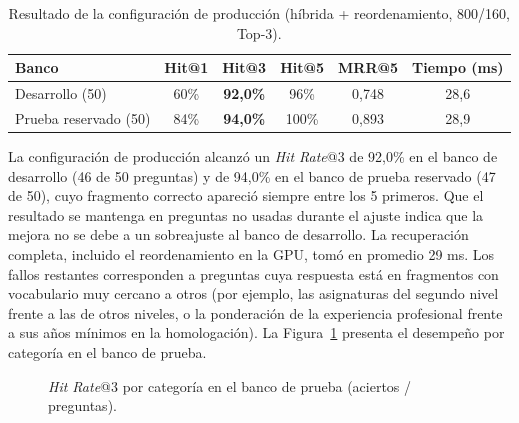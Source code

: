 \begin{table}[H]
  \caption{Resultado de la configuración de producción (híbrida + reordenamiento, 800/160, Top-3).}
  \label{tab:rag_final}
  \centering
  \small
  \renewcommand{\arraystretch}{1.2}
  \begin{tabular}{|l|c|c|c|c|c|}
    \hline
    \rowcolor[HTML]{EFEFEF}
    \textbf{Banco} & \textbf{Hit@1} & \textbf{Hit@3} & \textbf{Hit@5} & \textbf{MRR@5} & \textbf{Tiempo (ms)} \\ \hline
    Desarrollo (50) & 60\% & \textbf{92,0\%} & 96\% & 0,748 & 28,6 \\ \hline
    Prueba reservado (50) & 84\% & \textbf{94,0\%} & 100\% & 0,893 & 28,9 \\ \hline
  \end{tabular}
  \elaboradopor{\autorTFG}
\end{table}

La configuración de producción alcanzó un \textit{Hit Rate}@3 de 92,0\% en el banco de desarrollo (46 de 50 preguntas) y de 94,0\% en el banco de prueba reservado (47 de 50), cuyo fragmento correcto apareció siempre entre los 5 primeros. Que el resultado se mantenga en preguntas no usadas durante el ajuste indica que la mejora no se debe a un sobreajuste al banco de desarrollo. La recuperación completa, incluido el reordenamiento en la GPU, tomó en promedio 29 ms. Los fallos restantes corresponden a preguntas cuya respuesta está en fragmentos con vocabulario muy cercano a otros (por ejemplo, las asignaturas del segundo nivel frente a las de otros niveles, o la ponderación de la experiencia profesional frente a sus años mínimos en la homologación). La Figura~\ref{fig:rag_categoria} presenta el desempeño por categoría en el banco de prueba.

\begin{figure}[htbp]
\centering
{}
\caption{\textit{Hit Rate}@3 por categoría en el banco de prueba (aciertos / preguntas).}
\label{fig:rag_categoria}
\elaboradopor{\autorTFG}
\end{figure}

